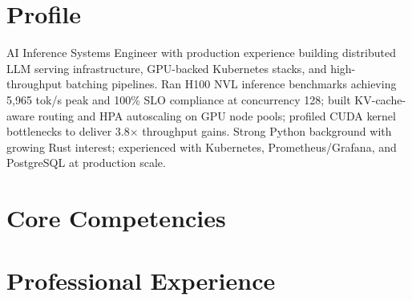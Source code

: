\documentclass[11pt,a4paper]{moderncv}
\begin{document}
\makecvtitle

\section{Profile}
AI Inference Systems Engineer with production experience building distributed LLM serving infrastructure, GPU-backed Kubernetes stacks, and high-throughput batching pipelines. Ran H100 NVL inference benchmarks achieving 5,965 tok/s peak and 100\% SLO compliance at concurrency 128; built KV-cache-aware routing and HPA autoscaling on GPU node pools; profiled CUDA kernel bottlenecks to deliver 3.8$\times$ throughput gains. Strong Python background with growing Rust interest; experienced with Kubernetes, Prometheus/Grafana, and PostgreSQL at production scale.

\section{Core Competencies}

\section{Professional Experience}
\end{document}
